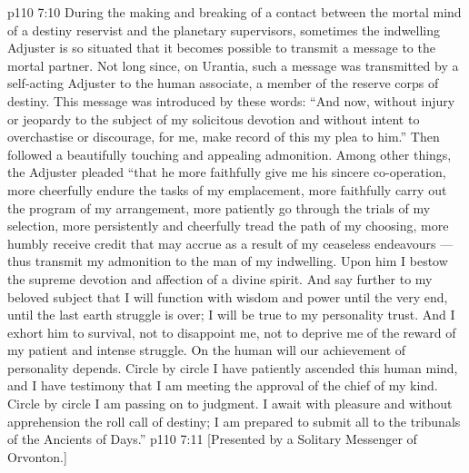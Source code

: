 \vs p110 7:10 \pc During the making and breaking of a contact between the mortal mind of a destiny reservist and the planetary supervisors, sometimes the indwelling Adjuster is so situated that it becomes possible to transmit a message to the mortal partner. Not long since, on Urantia, such a message was transmitted by a self\hyp{}acting Adjuster to the human associate, a member of the reserve corps of destiny. This message was introduced by these words: “And now, without injury or jeopardy to the subject of my solicitous devotion and without intent to overchastise or discourage, for me, make record of this my plea to him.” Then followed a beautifully touching and appealing admonition. Among other things, the Adjuster pleaded “that he more faithfully give me his sincere co\hyp{}operation, more cheerfully endure the tasks of my emplacement, more faithfully carry out the program of my arrangement, more patiently go through the trials of my selection, more persistently and cheerfully tread the path of my choosing, more humbly receive credit that may accrue as a result of my ceaseless endeavours --- thus transmit my admonition to the man of my indwelling. Upon him I bestow the supreme devotion and affection of a divine spirit. And say further to my beloved subject that I will function with wisdom and power until the very end, until the last earth struggle is over; I will be true to my personality trust. And I exhort him to survival, not to disappoint me, not to deprive me of the reward of my patient and intense struggle. On the human will our achievement of personality depends. Circle by circle I have patiently ascended this human mind, and I have testimony that I am meeting the approval of the chief of my kind. Circle by circle I am passing on to judgment. I await with pleasure and without apprehension the roll call of destiny; I am prepared to submit all to the tribunals of the Ancients of Days.”
\vsetoff
\vs p110 7:11 [Presented by a Solitary Messenger of Orvonton.]
\quizlink
